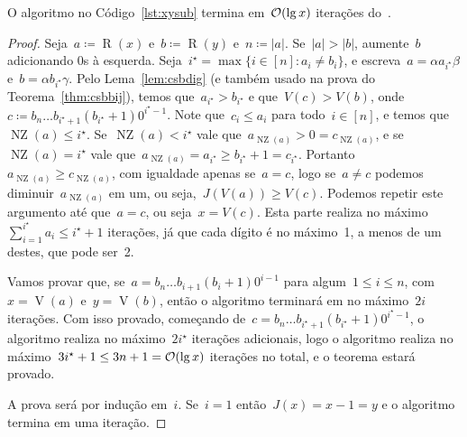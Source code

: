 \documentclass[main.tex]{subfiles}
\newcommand{\NZ}{\operatorname{NZ}}
\renewcommand{\V}{\operatorname{V}}
\newcommand{\R}{\operatorname{R}}
\begin{document}
\begin{theorem} \label{thm:xysub}
	O algoritmo no Código~\ref{lst:xysub} termina em~$\mathcal{O}(\lg x)$ iterações do~.
\end{theorem}
\begin{proof}
	Seja~$a \coloneqq \R(x)$ e~$b \coloneqq \R(y)$ e~$n \coloneqq |a|$. Se~$|a| > |b|$, aumente~$b$ adicionando 0s à esquerda. Seja~${i^\star = \max\{i \in [n] : a_i \neq b_i\}}$, e escreva~${a = \alpha a_{i^\star} \beta}$ e~${b = \alpha b_{i^\star} \gamma}$. Pelo Lema~\ref{lem:csbdig} (e também usado na prova do Teorema~\ref{thm:csbbij}), temos que~$a_{i^\star} > b_{i^\star}$ e que~${V(c) > V(b)}$, onde~${c \coloneqq b_n \ldots b_{i^\star + 1} (b_{i^\star} + 1) 0^{i^\star - 1}}$. Note que~$c_i \leq a_i$ para todo~${i \in [n]}$, e temos que~$\NZ(a) \leq i^\star$. Se~$\NZ(a) < i^\star$ vale que~$a_{\NZ(a)} > 0 = c_{\NZ(a)}$, e se~$\NZ(a) = i^\star$ vale que~${a_{\NZ(a)} = a_{i^\star} \geq b_{i^\star} + 1 = c_{i^\star}}$. Portanto~$a_{\NZ(a)} \geq c_{\NZ(a)}$, com igualdade apenas se~$a = c$, logo se~$a \neq c$ podemos diminuir~$a_{\NZ(a)}$ em um, ou seja,~$J(V(a)) \geq V(c)$. Podemos repetir este argumento até que~$a = c$, ou seja~$x = V(c)$. Esta parte realiza no máximo~${\sum\limits_{i = 1}^{i^\star}{a_i} \leq i^\star + 1}$ iterações, já que cada dígito é no máximo~1, a menos de um destes, que pode ser~2.

	Vamos provar que, se~${a = b_n \ldots b_{i+1} (b_i + 1) 0^{i-1}}$ para algum~$1 \leq i \leq n$, com~$x = \V(a)$ e~$y = \V(b)$, então o algoritmo terminará em no máximo~$2i$ iterações. Com isso provado, começando de~${c = b_n \ldots b_{i^\star + 1} (b_{i^\star} + 1) 0^{i^\star - 1}}$, o algoritmo realiza no máximo~$2i^\star$ iterações adicionais, logo o algoritmo realiza no máximo~${3i^\star + 1 \leq 3n+1 = \mathcal{O}(\lg x)}$ iterações no total, e o teorema estará provado.

	A prova será por indução em~$i$. Se~$i = 1$ então~${J(x) = x - 1 = y}$ e o algoritmo termina em uma iteração.


\end{proof}
\end{document}
